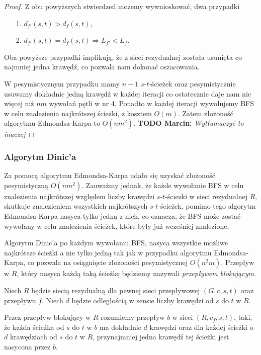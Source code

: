\begin{theorem}
\begin{proof}
		Z obu powyższych stwierdzeń możemy wywnioskować, dwa przypadki
		\begin{itemize}
			\item[1.] $d_{f'}(s, t) > d_f(s, t)$,
			\item[2.] $d_{f'}(s, t) = d_f(s, t) \Rightarrow 
			L_{f'} < L_f$.
		\end{itemize}
		Oba powyższe przypadki implikują, że z sieci rezydualnej została 
		usunięta co najmniej jedna krawędź, co pozwala nam 
		dokonać oszacowania.
		
		W pesymistycznym przypadku mamy $n-1$ $s$-$t$-ścieżek oraz 
		pesymistycznie usuwamy dokładnie jedną krawędź w każdej iteracji
		co ostatecznie daje nam nie więcej niż $nm$ wywołań pętli w nr 4.
		Ponadto w każdej iteracji wywołujemy BFS w celu znalezienia najkrótszej
		ścieżki, z kosztem $O(m)$. Zatem złożoność algorytmu Edmondsa-Karpa
		to $O(nm^2)$. \textbf{TODO Marcin:} \textit{Wytłumaczyć to inaczej}
		
	\end{proof}
\end{theorem}

\subsubsection{Algorytm Dinic'a}
Za pomocą algorytmu Edmondsa-Karpa udało się uzyskać złożoność 
pesymistyczną $O(nm^2)$. Zauważmy jednak, że każde wywołanie 
BFS w celu znalezienia najkrótszej względem liczby krawędzi 
$s$-$t$-ściezki w sieci rezydualnej $R$, skutkuje znalezieniem 
wszystkich najkrótszych $s$-$t$-ścieżek, pomimo tego algorytm
Edmondsa-Karpa nasyca tylko jedną z nich, co oznacza, że
BFS może zostać wywołany w celu znalezienia ścieżek,
które były już wcześniej znalezione.

Algorytm Dinic'a po każdym wywołaniu BFS, nasyca wszystkie możliwe najkrótsze ścieżki a nie tylko jedną
tak jak w przypadku algorytmu Edmondsa-Karpa, co pozwala na 
osiągnięcie złożoności pesymistycznej $O(n^2m)$. Przepływ w $R$, który nasyca każdą taką ścieżkę
będziemy nazywali \textit{przepływem blokującym}.

\begin{defi}
	Niech $R$ będzie siecią rezydualną dla pewnej sieci przepływowej
	$(G, c, s, t)$ oraz przepływu $f$. Niech $d$ będzie odległością w sensie
	liczby krawędzi od $s$ do $t$ w $R$.
	
	Przez przepływ blokujący w $R$ rozumiemy przepływ $b$ w sieci
	$(R, c_f, s, t)$, taki, że każda ścieżka od $s$ do $t$ 
	w $b$ ma dokładnie $d$ krawędzi oraz dla każdej ścieżki o $d$ 
	krawędziach od $s$ do $t$ w $R$, przynajmniej jedna krawędź tej ścieżki
	jest nasycona przez $b$.
\end{defi}

